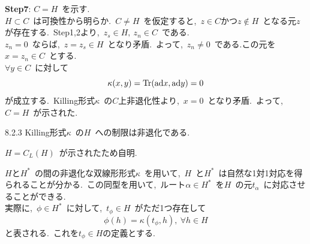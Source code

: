 \documentclass[uplatex,dvipdfmx]{jsarticle}
\begin{document}
\begin{myproof}
    \textbf{Step7}:
    $C = H$~を示す.\\
    $H \subset C$~は可換性から明らか.~$C \neq H$~を仮定すると,~$z \in C$かつ$z \notin H$~となる元$z$が存在する.~Step1,2より,~$z_s \in H,~z_n \in C$~である.\\
    $z_n = 0$~ならば,~$z = z_s \in H$~となり矛盾.~よって,~$z_n \neq 0$~である.この元を$x = z_n \in C$~とする.\\
    $\forall y \in C$~に対して
    \begin{equation*}
        \kappa(x,y) = \Tr(\text{ad}x, \text{ad}y) = 0
    \end{equation*}
    が成立する.~Killing形式$\kappa$~の$C$上非退化性より,~$x = 0$~となり矛盾.~よって,~$C = H$~が示された.
\end{myproof}
\begin{mycor}{8.2.3}
    Killing形式$\kappa$~の$H$~への制限は非退化である.
\end{mycor}
\begin{myproof}
    $H = C_L(H)$~が示されたため自明.
\end{myproof}
$H$と$H^*$~の間の非退化な双線形形式$\kappa$~を用いて,~$H$~と$H^*$~は自然な1対1対応を得られることが分かる.~この同型を用いて,~ルート$\alpha \in H^*$~を$H$~の元$t_\alpha$~に対応させることができる.\\
実際に,~$\phi \in H^*$~に対して,~$t_\phi \in H$~がただ1つ存在して
\begin{equation*}
    \phi(h) = \kappa(t_\phi, h),~\forall h \in H
\end{equation*}
と表される.~これを$t_\phi \in H$の定義とする.~
\newpage
\end{document}
